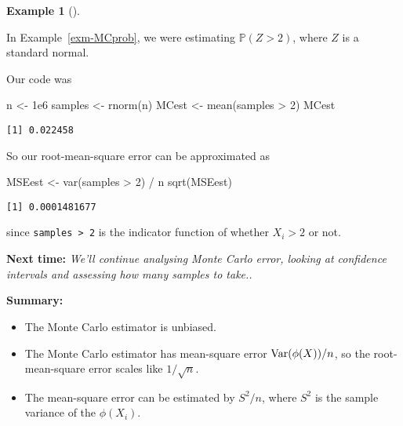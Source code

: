 \documentclass[
  letterpaper,
  DIV=11,
  numbers=noendperiod]{scrreprt}
\newenvironment{Shaded}{\begin{snugshade}}{\end{snugshade}}
\newcommand{\DecValTok}[1]{\textcolor[rgb]{0.68,0.00,0.00}{#1}}
\newcommand{\FloatTok}[1]{\textcolor[rgb]{0.68,0.00,0.00}{#1}}
\newcommand{\FunctionTok}[1]{\textcolor[rgb]{0.28,0.35,0.67}{#1}}
\newcommand{\NormalTok}[1]{\textcolor[rgb]{0.00,0.23,0.31}{#1}}
\newcommand{\OtherTok}[1]{\textcolor[rgb]{0.00,0.23,0.31}{#1}}
\newcommand{\SpecialCharTok}[1]{\textcolor[rgb]{0.37,0.37,0.37}{#1}}
\theoremstyle{plain}
\theoremstyle{definition}
\theoremstyle{definition}
\newtheorem{example}{Example}[chapter]
\theoremstyle{remark}
\begin{document}
\begin{example}[]\protect\hypertarget{exm-MCexp2}{}\label{exm-MCexp2}

In Example~\ref{exm-MCprob}, we were estimating \(\mathbb P(Z > 2)\),
where \(Z\) is a standard normal.

Our code was

\begin{Shaded}
\begin{Highlighting}[]
\NormalTok{n }\OtherTok{\textless{}{-}} \FloatTok{1e6}
\NormalTok{samples }\OtherTok{\textless{}{-}} \FunctionTok{rnorm}\NormalTok{(n)}
\NormalTok{MCest }\OtherTok{\textless{}{-}} \FunctionTok{mean}\NormalTok{(samples }\SpecialCharTok{\textgreater{}} \DecValTok{2}\NormalTok{)}
\NormalTok{MCest}
\end{Highlighting}
\end{Shaded}

\begin{verbatim}
[1] 0.022458
\end{verbatim}

So our root-mean-square error can be approximated as

\begin{Shaded}
\begin{Highlighting}[]
\NormalTok{MSEest }\OtherTok{\textless{}{-}} \FunctionTok{var}\NormalTok{(samples }\SpecialCharTok{\textgreater{}} \DecValTok{2}\NormalTok{) }\SpecialCharTok{/}\NormalTok{ n}
\FunctionTok{sqrt}\NormalTok{(MSEest)}
\end{Highlighting}
\end{Shaded}

\begin{verbatim}
[1] 0.0001481677
\end{verbatim}

since \texttt{samples\ \textgreater{}\ 2} is the indicator function of
whether \(X_i > 2\) or not.

\end{example}

\textbf{Next time:} \emph{We'll continue analysing Monte Carlo error,
looking at confidence intervals and assessing how many samples to
take..}

\textbf{Summary:}

\begin{itemize}
\item
  The Monte Carlo estimator is unbiased.
\item
  The Monte Carlo estimator has mean-square error \(\operatorname{Var}(\phi(X))/n\),
  so the root-mean-square error scales like \(1/\sqrt{n}\).
\item
  The mean-square error can be estimated by \(S^2 / n\), where \(S^2\)
  is the sample variance of the \(\phi(X_i)\).
\end{itemize}
\end{document}
